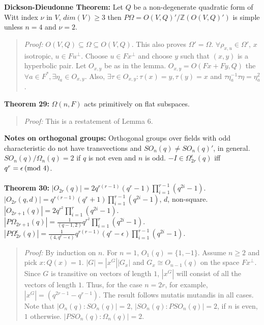 {\bf Dickson-Dieudonne Theorem:}
Let $Q$ be a non-degenerate quadratic form of Witt index $\nu$ in $V$,
$dim(V) \ge 3$ then $P \Omega = O(V,Q)'/{\mathbb Z}(O(V,Q)')$ is simple unless $n=4$ and
$\nu = 2$.
\begin{quote}
\emph{Proof:}  
$O(V,Q) \subseteq \Omega \subseteq O(V,Q)$.  This also proves $\Omega'= \Omega$.
$\forall \rho_{x,u} \in \Omega'$, $x$ isotropic, $u \in F u^{\perp}$.
Choose $u \in F x^{\perp}$ and choose $y$ such that $(x, y)$ is a hyperbolic pair.
Let $O_{x,y}$ be as in the lemma.  $O_{x,y}= O(Fx + Fy, Q)$ the 
$\forall a \in F^* , \exists \eta_a \in O_{x,y}$.  Also, $\exists \tau \in O_{x, y}: 
\tau(x)=y, \tau(y)=x$ and $\tau \eta_a^{-1} \tau \eta= \eta_a^2$.
\end{quote}
{\bf Theorem 29:}
$\Omega(n,F)$ acts primitively on flat subspaces.
\begin{quote}
\emph{Proof:}  
This is a restatement of Lemma 6.
\end{quote}
{\bf Notes on orthogonal groups:} Orthogonal groups over fields with odd characteristic do not have transvections and
$SO_n(q) \neq SO_n(q)'$, in general.  $SO_n(q)/\Omega_n(q) =2$ if $q$ is not even and $n$ is odd. 
$-I \in \Omega_{2r}^{\epsilon}(q)$ iff $q^r = \epsilon \thinspace \textnormal{(mod } 4 \textnormal{)}$.
\\
\\
{\bf Theorem 30:} 
$|O_{2r}(q)|= 2 q^{r(r-1)} (q^r - 1) \prod_{i=1}^{r-1} (q^{2i}-1)$.\\
$|O_{2r}(q, d)|= q^{r(r-1)} (q^r + 1) \prod_{i=1}^{r-1} (q^{2i}-1)$,
$d$, non-square.\\
$|O_{2r+1}(q)|= 2 q^{r^2} \prod_{i=1}^{r} (q^{2i}-1)$.\\
$|P\Omega_{2r+1}(q)|= {\frac 1 {(q-1,2)}}  q^{r^2} \prod_{i=1}^{r} (q^{2i}-1)$.\\
$|P\Omega_{2r}^{\epsilon}(q)|= {\frac 1 {(4, q^r - \epsilon)}} q^{r(r-1)} (q^r - \epsilon) \prod_{i=1}^{r-1} (q^{2i}-1)$.\\
\begin{quote}
\emph{Proof:}  By induction on $n$.  For $n=1$, $O_1(q)= \{ 1, -1 \}$.
Assume $n \ge 2$ and pick $x: Q(x)=1$.  $|G|= |x^G| |G_x|$ and $G_x \cong O_{n-1}(q)$ on the
space $Fx^{\perp}$.  Since $G$ is transitive on vectors of length $1$, $|x^G|$ will consist of
all the vectors of length $1$.
Thus, for the case $n=2r$, 
for example, $|x^G|= (q^{2r-1} -q^{r-1})$.  The
result follows mutatis mutandis in all cases.
Note that 
$|O_n(q):SO_n(q)| = 2$,
$|SO_n(q):PSO_n(q)| = 2$, if $n$ is even, $1$ otherwise.
$|PSO_n(q):\Omega_n(q)| = 2$.
\end{quote}
